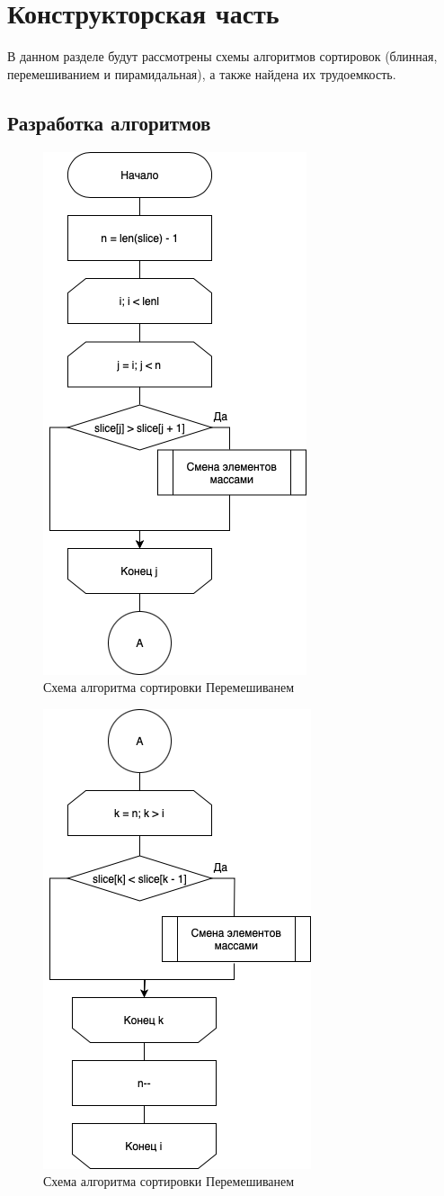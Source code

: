 \chapter{Конструкторская часть}

В данном разделе будут рассмотрены схемы алгоритмов сортировок 
(блинная, перемешиванием и пирамидальная), а также найдена их трудоемкость.

\section{Разработка алгоритмов}

\begin{figure}[h]
    \centering
    \includegraphics[width=0.4\linewidth]{img/sheker1.png}
    \caption{Схема алгоритма сортировки Перемешиванем}
    \label{fig:shecker}
\end{figure}

\begin{figure}[h]
    \centering
    \includegraphics[width=0.4\linewidth]{img/sheker2.png}
    \caption{Схема алгоритма сортировки Перемешиванем}
\end{figure}


